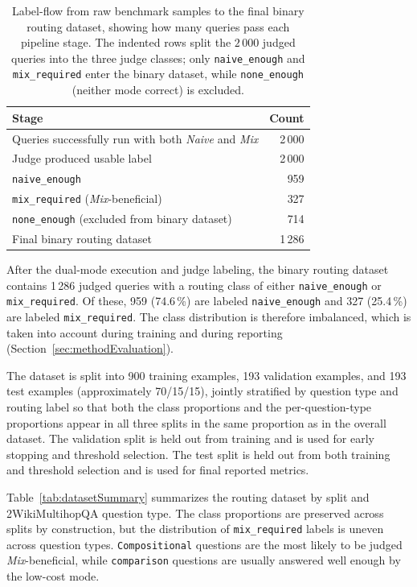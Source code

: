 \documentclass[english, bibtex]{kththesis}               %
\numberwithin{listing}{chapter}
\begin{document}
\begin{table}[!ht]
\begin{center}
\caption{Label-flow from raw benchmark samples to the final binary routing dataset, showing how many queries pass each pipeline stage. The indented rows split the $2\,000$ judged queries into the three judge classes; only \texttt{naive\_enough} and \texttt{mix\_required} enter the binary dataset, while \texttt{none\_enough} (neither mode correct) is excluded.}
\label{tab:datasetFlow}
\begin{tabular}{l|r}
\textbf{Stage} & \textbf{Count} \\
\hline
Queries successfully run with both \emph{Naive} and \emph{Mix} & 2\,000 \\
Judge produced usable label & 2\,000 \\
\quad \texttt{naive\_enough} & 959 \\
\quad \texttt{mix\_required} (\emph{Mix}-beneficial) & 327 \\
\quad \texttt{none\_enough} (excluded from binary dataset) & 714 \\
Final binary routing dataset & 1\,286 \\
\end{tabular}
\end{center}
\end{table}

After the dual-mode execution and judge labeling, the binary routing dataset contains 1\,286 judged queries with a routing class of either \texttt{naive\_enough} or \texttt{mix\_required}. Of these, 959 (74.6\,\%) are labeled \texttt{naive\_enough} and 327 (25.4\,\%) are labeled \texttt{mix\_required}. The class distribution is therefore imbalanced, which is taken into account during training and during reporting (Section~\ref{sec:methodEvaluation}).

The dataset is split into 900 training examples, 193 validation examples, and 193 test examples (approximately 70/15/15), jointly stratified by question type and routing label so that both the class proportions and the per-question-type proportions appear in all three splits in the same proportion as in the overall dataset. The validation split is held out from training and is used for early stopping and threshold selection. The test split is held out from both training and threshold selection and is used for final reported metrics.

Table~\ref{tab:datasetSummary} summarizes the routing dataset by split and 2WikiMultihopQA question type. The class proportions are preserved across splits by construction, but the distribution of \texttt{mix\_required} labels is uneven across question types. \texttt{Compositional} questions are the most likely to be judged \emph{Mix}-beneficial, while \texttt{comparison} questions are usually answered well enough by the low-cost mode.
\end{document}
